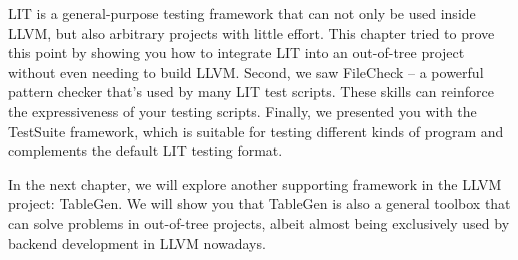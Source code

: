 LIT is a general-purpose testing framework that can not only be used inside LLVM, but also arbitrary projects with little effort. This chapter tried to prove this point by showing you how to integrate LIT into an out-of-tree project without even needing to build LLVM. Second, we saw FileCheck – a powerful pattern checker that's used by many LIT test scripts. These skills can reinforce the expressiveness of your testing scripts. Finally, we presented you with the TestSuite framework, which is suitable for testing different kinds of program and complements the default LIT testing format.

In the next chapter, we will explore another supporting framework in the LLVM project: TableGen. We will show you that TableGen is also a general toolbox that can solve problems in out-of-tree projects, albeit almost being exclusively used by backend development in LLVM nowadays.